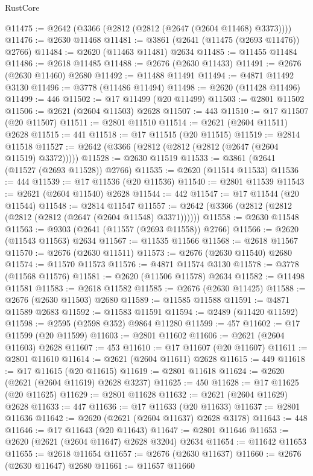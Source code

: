 \begin{lexlean}{RustCore}
\begin{coremodule}
@11475 := @2642 (@3366 (@2812 (@2812 (@2647 (@2604 @11468) @3373))))
@11476 := @2630 @11468
@11481 := @3861 (@2641 (@11475 (@2693 @11476)) @2766)
@11484 := @2620 (@11463 @11481) @2634
@11485 := @11455 @11484
@11486 := @2618 @11485
@11488 := @2676 (@2630 @11433)
@11491 := @2676 (@2630 @11460) @2680
@11492 := @11488 @11491
@11494 := @4871 @11492 @3130
@11496 := @3778 (@11486 @11494)
@11498 := @2620 (@11428 @11496)
@11499 := 446
@11502 := @17 @11499 (@20 @11499)
@11503 := @2801 @11502
@11506 := @2621 (@2604 @11503) @2628
@11507 := 443
@11510 := @17 @11507 (@20 @11507)
@11511 := @2801 @11510
@11514 := @2621 (@2604 @11511) @2628
@11515 := 441
@11518 := @17 @11515 (@20 @11515)
@11519 := @2814 @11518
@11527 := @2642 (@3366 (@2812 (@2812 (@2812 (@2647 (@2604 @11519) @3372)))))
@11528 := @2630 @11519
@11533 := @3861 (@2641 (@11527 (@2693 @11528)) @2766)
@11535 := @2620 (@11514 @11533)
@11536 := 444
@11539 := @17 @11536 (@20 @11536)
@11540 := @2801 @11539
@11543 := @2621 (@2604 @11540) @2628
@11544 := 442
@11547 := @17 @11544 (@20 @11544)
@11548 := @2814 @11547
@11557 := @2642 (@3366 (@2812 (@2812 (@2812 (@2812 (@2647 (@2604 @11548) @3371))))))
@11558 := @2630 @11548
@11563 := @9303 (@2641 (@11557 (@2693 @11558)) @2766)
@11566 := @2620 (@11543 @11563) @2634
@11567 := @11535 @11566
@11568 := @2618 @11567
@11570 := @2676 (@2630 @11511)
@11573 := @2676 (@2630 @11540) @2680
@11574 := @11570 @11573
@11576 := @4871 @11574 @3130
@11578 := @3778 (@11568 @11576)
@11581 := @2620 (@11506 @11578) @2634
@11582 := @11498 @11581
@11583 := @2618 @11582
@11585 := @2676 (@2630 @11425)
@11588 := @2676 (@2630 @11503) @2680
@11589 := @11585 @11588
@11591 := @4871 @11589 @2683
@11592 := @11583 @11591
@11594 := @2489 (@11420 @11592)
@11598 := @2595 (@2598 @352) @9864 @11280
@11599 := 457
@11602 := @17 @11599 (@20 @11599)
@11603 := @2801 @11602
@11606 := @2621 (@2604 @11603) @2628
@11607 := 453
@11610 := @17 @11607 (@20 @11607)
@11611 := @2801 @11610
@11614 := @2621 (@2604 @11611) @2628
@11615 := 449
@11618 := @17 @11615 (@20 @11615)
@11619 := @2801 @11618
@11624 := @2620 (@2621 (@2604 @11619) @2628 @3237)
@11625 := 450
@11628 := @17 @11625 (@20 @11625)
@11629 := @2801 @11628
@11632 := @2621 (@2604 @11629) @2628
@11633 := 447
@11636 := @17 @11633 (@20 @11633)
@11637 := @2801 @11636
@11642 := @2620 (@2621 (@2604 @11637) @2628 @3178)
@11643 := 448
@11646 := @17 @11643 (@20 @11643)
@11647 := @2801 @11646
@11653 := @2620 (@2621 (@2604 @11647) @2628 @3204) @2634
@11654 := @11642 @11653
@11655 := @2618 @11654
@11657 := @2676 (@2630 @11637)
@11660 := @2676 (@2630 @11647) @2680
@11661 := @11657 @11660

\end{coremodule}
\end{lexlean}
